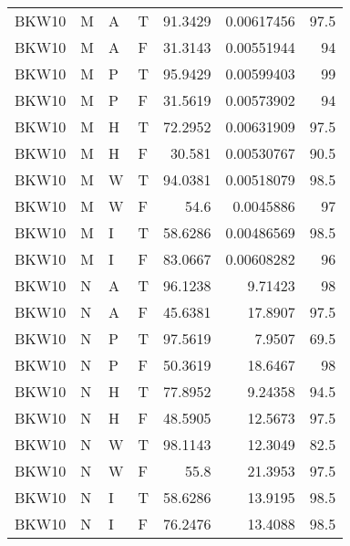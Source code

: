 \begin{tabular}{llllrrr}
    BKW10    & M     & A     & T          & 91.3429    & 0.00617456 & 97.5     \\
    BKW10    & M     & A     & F          & 31.3143    & 0.00551944 & 94       \\
    BKW10    & M     & P     & T          & 95.9429    & 0.00599403 & 99       \\
    BKW10    & M     & P     & F          & 31.5619    & 0.00573902 & 94       \\
    BKW10    & M     & H     & T          & 72.2952    & 0.00631909 & 97.5     \\
    BKW10    & M     & H     & F          & 30.581     & 0.00530767 & 90.5     \\
    BKW10    & M     & W     & T          & 94.0381    & 0.00518079 & 98.5     \\
    BKW10    & M     & W     & F          & 54.6       & 0.0045886  & 97       \\
    BKW10    & M     & I     & T          & 58.6286    & 0.00486569 & 98.5     \\
    BKW10    & M     & I     & F          & 83.0667    & 0.00608282 & 96       \\
    BKW10    & N     & A     & T          & 96.1238    & 9.71423    & 98       \\
    BKW10    & N     & A     & F          & 45.6381    & 17.8907    & 97.5     \\
    BKW10    & N     & P     & T          & 97.5619    & 7.9507     & 69.5     \\
    BKW10    & N     & P     & F          & 50.3619    & 18.6467    & 98       \\
    BKW10    & N     & H     & T          & 77.8952    & 9.24358    & 94.5     \\
    BKW10    & N     & H     & F          & 48.5905    & 12.5673    & 97.5     \\
    BKW10    & N     & W     & T          & 98.1143    & 12.3049    & 82.5     \\
    BKW10    & N     & W     & F          & 55.8       & 21.3953    & 97.5     \\
    BKW10    & N     & I     & T          & 58.6286    & 13.9195    & 98.5     \\
    BKW10    & N     & I     & F          & 76.2476    & 13.4088    & 98.5     \\
    \hline
\end{tabular}